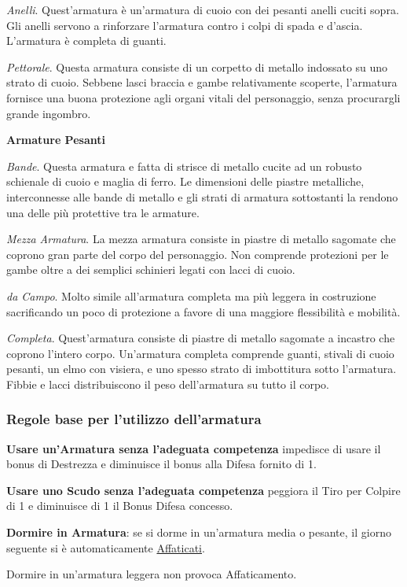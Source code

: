 \begin{multicols}{2}
\emph{Anelli}. Quest'armatura è un'armatura di cuoio con dei pesanti anelli cuciti sopra. Gli anelli servono a rinforzare l'armatura contro i colpi di spada e d'ascia. L'armatura è completa di guanti.

\emph{Pettorale}. Questa armatura consiste di un corpetto di metallo indossato su uno strato di cuoio. Sebbene lasci braccia e gambe relativamente scoperte, l'armatura fornisce una buona protezione agli organi vitali del personaggio, senza procurargli grande ingombro.

\textbf{Armature Pesanti}

\emph{Bande}. Questa armatura e fatta di strisce di metallo cucite ad un robusto schienale di cuoio e maglia di ferro. Le dimensioni delle piastre metalliche, interconnesse alle bande di metallo e gli strati di armatura sottostanti la rendono una delle più protettive tra le armature.

\emph{Mezza Armatura}. La mezza armatura consiste in piastre di metallo sagomate che coprono gran parte del corpo del personaggio. Non comprende protezioni per le gambe oltre a dei semplici schinieri legati con lacci di cuoio.

\emph{da Campo}. Molto simile all'armatura completa ma più leggera in costruzione sacrificando un poco di protezione a favore di una maggiore flessibilità e mobilità.

\emph{Completa}. Quest'armatura consiste di piastre di metallo sagomate a incastro che coprono l'intero corpo. Un'armatura completa comprende guanti, stivali di cuoio pesanti, un elmo con visiera, e uno spesso strato di imbottitura sotto l'armatura. Fibbie e lacci distribuiscono il peso dell'armatura su tutto il corpo.

\subsubsection{Regole base per l'utilizzo dell'armatura}

\textbf{Usare un'Armatura senza l'adeguata competenza} impedisce di usare il bonus di Destrezza e diminuisce il bonus alla Difesa fornito di 1.

\textbf{Usare uno Scudo senza l'adeguata competenza} peggiora il Tiro per Colpire di 1 e diminuisce di 1 il Bonus Difesa concesso.

\textbf{Dormire in Armatura}: se si dorme in un'armatura media o pesante, il giorno seguente si è automaticamente \hyperlink{affaticato}{Affaticati}.

Dormire in un'armatura leggera non provoca Affaticamento.


\end{multicols}
